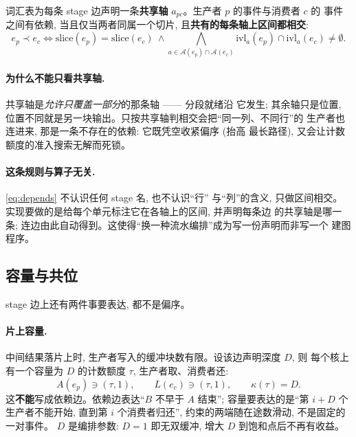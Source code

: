 \documentclass[11pt,a4paper]{article}
\begin{document}
词汇表为每条 stage 边声明一条\textbf{共享轴} $a_{pc}$。生产者 $p$ 的事件与消费者 $c$ 的
事件之间有依赖, 当且仅当两者同属一个切片, 且\textbf{共有的每条轴上区间都相交}:
\begin{equation}
e_p \prec e_c \iff
\text{slice}(e_p) = \text{slice}(e_c) \ \wedge
\bigwedge_{a \in \mathcal{A}(e_p) \cap \mathcal{A}(e_c)}
\mathrm{ivl}_a(e_p) \cap \mathrm{ivl}_a(e_c) \ne \emptyset .
\label{eq:depends}
\end{equation}

\paragraph{为什么不能只看共享轴.} 共享轴是\emph{允许只覆盖一部分}的那条轴 —— 分段就绪沿
它发生; 其余轴只是位置, 位置不同就是另一块输出。只按共享轴判相交会把``同一列、不同行''的
生产者也连进来, 那是一条不存在的依赖: 它既凭空收紧偏序 (抬高
最长路径), 又会让计数额度的准入搜索无解而死锁。

\paragraph{这条规则与算子无关.} \eqref{eq:depends} 不认识任何 stage 名, 也不认识``行''
与``列''的含义, 只做区间相交。实现要做的是给每个单元标注它在各轴上的区间, 并声明每条边
的共享轴是哪一条; 连边由此自动得到。这使得``换一种流水编排''成为写一份声明而非写一个
建图程序。

\subsection{容量与共位}
\label{sec:capacity}

stage 边上还有两件事要表达, 都不是偏序。

\paragraph{片上容量.} 中间结果落片上时, 生产者写入的缓冲块数有限。设该边声明深度 $D$, 则
每个核上有一个容量为 $D$ 的计数额度 $\tau$, 生产者取、消费者还:
\begin{equation}
A(e_p) \ni (\tau, 1), \qquad L(e_c) \ni (\tau, 1), \qquad \kappa(\tau) = D .
\label{eq:credit}
\end{equation}
这\textbf{不能}写成依赖边。依赖边表达``$B$ 不早于 $A$ 结束''; 容量要表达的是``第 $i+D$ 个
生产者不能开始, 直到第 $i$ 个消费者归还'', 约束的两端随在途数滑动, 不是固定的一对事件。
$D$ 是编排参数: $D=1$ 即无双缓冲, 增大 $D$ 到饱和点后不再有收益。
\end{document}

